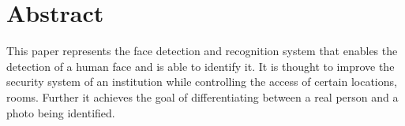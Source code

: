 %
%
\newpage

%
%
\section*{Abstract}


\color{black} 
This paper represents the face detection and recognition system that enables the detection of a human face and is able to identify it. It is thought to improve the security system of an institution while controlling the access of certain locations, rooms. Further it achieves the goal of differentiating between a real person and a photo being identified.
\color{black} 
